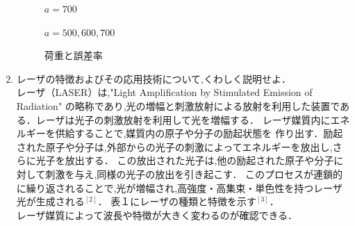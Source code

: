 \documentclass[a4paper,12pt]{jsarticle}
\begin{document}
\begin{enumerate}
\begin{figure}[h]
  \caption{$a = 700$}
\end{figure}
\clearpage
\begin{figure}[h]
  \centering
  \caption{$a = 500,600,700$}
\end{figure}
\clearpage
\begin{figure}[h]
  \centering
  \caption{荷重と誤差率}
\end{figure}
\clearpage
\item レーザの特徴およびその応用技術について,くわしく説明せよ．\\
\quad レーザ（LASER）は,"Light Amplification by Stimulated Emission of Radiation" 
の略称であり,光の増幅と刺激放射による放射を利用した装置である．レーザは光子の刺激放射を利用して光を増幅する．
レーザ媒質内にエネルギーを供給することで,媒質内の原子や分子の励起状態を
作り出す．励起された原子や分子は,外部からの光子の刺激によってエネルギーを放出し,さらに光子を放出する．
この放出された光子は,他の励起された原子や分子に対して刺激を与え,同様の光子の放出を引き起こす．
このプロセスが連鎖的に繰り返されることで,光が増幅され,高強度・高集束・単色性を持つレーザ光が生成される$^{[2]}$．
表１にレーザの種類と特徴を示す$^{[3]}$．\\レーザ媒質によって波長や特徴が大きく変わるのが確認できる．



\end{enumerate}
\end{document}

